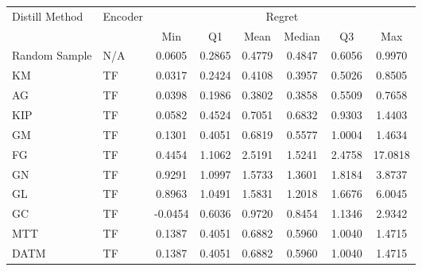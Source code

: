 \begin{tabular}{llcccccc}
\toprule
Distill Method & Encoder & \multicolumn{6}{c}{Regret} \\
 &  & Min & Q1 & Mean & Median & Q3 & Max \\
\midrule
Random Sample & N/A & 0.0605 & 0.2865 & 0.4779 & 0.4847 & 0.6056 & 0.9970 \\
\midrule
KM &  TF & 0.0317 & 0.2424 & 0.4108 & 0.3957 & 0.5026 & 0.8505 \\
\midrule
AG &  TF & 0.0398 & 0.1986 & 0.3802 & 0.3858 & 0.5509 & 0.7658 \\
\midrule
KIP &  TF & 0.0582 & 0.4524 & 0.7051 & 0.6832 & 0.9303 & 1.4403 \\
\midrule
GM &  TF & 0.1301 & 0.4051 & 0.6819 & 0.5577 & 1.0004 & 1.4634 \\
\midrule
FG &  TF & 0.4454 & 1.1062 & 2.5191 & 1.5241 & 2.4758 & 17.0818 \\
\midrule
GN &  TF & 0.9291 & 1.0997 & 1.5733 & 1.3601 & 1.8184 & 3.8737 \\
\midrule
GL &  TF & 0.8963 & 1.0491 & 1.5831 & 1.2018 & 1.6676 & 6.0045 \\
\midrule
GC &  TF & -0.0454 & 0.6036 & 0.9720 & 0.8454 & 1.1346 & 2.9342 \\
\midrule
MTT &  TF & 0.1387 & 0.4051 & 0.6882 & 0.5960 & 1.0040 & 1.4715 \\
DATM &  TF & 0.1387 & 0.4051 & 0.6882 & 0.5960 & 1.0040 & 1.4715 \\
\bottomrule
\end{tabular}
